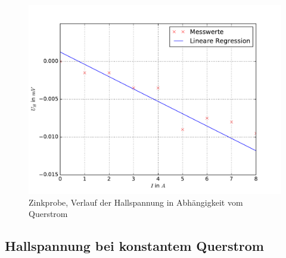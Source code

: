 \begin{figure}
  \centering
  \includegraphics[width=\textwidth]{pics/u_h_zink_konstB.pdf}
  \caption{Zinkprobe, Verlauf der Hallspannung in Abhängigkeit vom Querstrom}
  \label{fig: uh_konstB_zink}
\end{figure}


\subsection{Hallspannung bei konstantem Querstrom}
